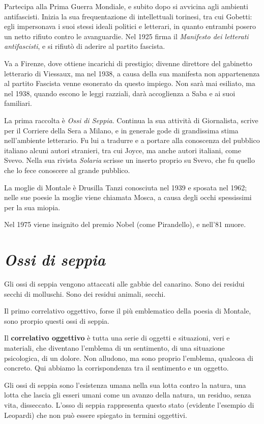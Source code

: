 \documentclass[a4paper, twoside, titlepage]{book}
\begin{document}
Partecipa alla Prima Guerra Mondiale, e subito dopo si avvicina agli ambienti antifascisti. Inizia la sua frequentazione di intellettuali torinesi, tra cui Gobetti: egli impersonava i suoi stessi ideali politici e letterari, in quanto entrambi posero un netto rifiuto contro le avanguardie.
Nel 1925 firma il \textit{Manifesto dei letterati antifascisti}, e si rifiutò di aderire al partito fascista. 

Va a Firenze, dove ottiene incarichi di prestigio; divenne direttore del gabinetto letterario di Viessaux, ma nel 1938, a causa della sua manifesta non appartenenza al partito Fascista venne esonerato da questo impiego. Non sarà mai esiliato, ma nel 1938, quando escono le leggi razziali, darà accoglienza a Saba e ai suoi familiari.

La prima raccolta è \textit{Ossi di Seppia}. Continua la sua attività di Giornalista, scrive per il Corriere della Sera a Milano, e in generale gode di grandissima stima nell'ambiente letterario.
Fu lui a tradurre e a portare alla conoscenza del pubblico italiano alcuni autori stranieri, tra cui Joyce, ma anche autori italiani, come Svevo. Nella sua rivista \textit{Solaria} scrisse un inserto proprio su Svevo, che fu quello che lo fece conoscere al grande pubblico.

La moglie di Montale è Drusilla Tanzi conosciuta nel 1939 e sposata nel 1962; nelle sue poesie la moglie viene chiamata Mosca, a causa degli occhi spessissimi per la sua miopia.

Nel 1975 viene insignito del premio Nobel (come Pirandello), e nell'81 muore.

\section{\textit{Ossi di seppia}}

Gli ossi di seppia vengono attaccati alle gabbie del canarino. Sono dei residui secchi di molluschi. Sono dei residui animali, secchi.

Il primo correlativo oggettivo, forse il più emblematico della poesia di Montale, sono prorpio questi ossi di seppia.

Il \textbf{correlativo oggettivo} è tutta una serie di oggetti e situazioni, veri e materiali, che diventano l'emblema di un sentimento, di una situazione psicologica, di un dolore. Non alludono, ma sono proprio l'emblema, qualcosa di concreto. Qui abbiamo la corrispondenza tra il sentimento e un oggetto.

Gli ossi di seppia sono l'esistenza umana nella sua lotta contro la natura, una lotta che lascia gli esseri umani come un avanzo della natura, un residuo, senza vita, disseccato. L'osso di seppia rappresenta questo stato (evidente l'esempio di Leopardi) che non può essere spiegato in termini oggettivi.
\end{document}
